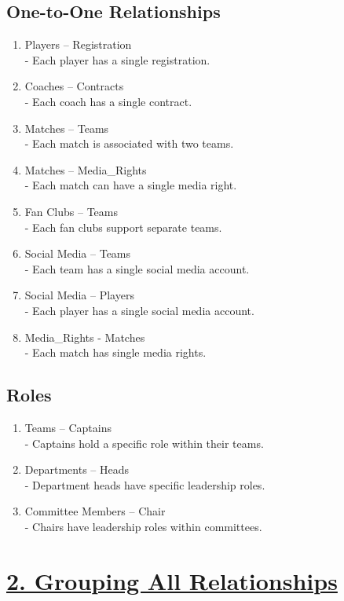 \documentclass[a4paper, 12pt]{article}
\begin{document}
\subsection{One-to-One Relationships}

\begin{enumerate}
\item Players – Registration \\
- Each player has a single registration.
\item Coaches – Contracts \\
- Each coach has a single contract.
\item Matches – Teams \\
- Each match is associated with two teams.
\item Matches – Media\_Rights \\
- Each match can have a single media right.
\item Fan Clubs – Teams \\
- Each fan clubs support separate teams.
\item Social Media – Teams \\
- Each team has a single social media account.
\item Social Media – Players \\
- Each player has a single social media account.
\item Media\_Rights - Matches\\
- Each match has single media rights.
\end{enumerate}

\subsection{Roles}

\begin{enumerate}
\item Teams – Captains \\
- Captains hold a specific role within their teams.
\item Departments – Heads \\
- Department heads have specific leadership roles.
\item Committee Members – Chair \\
- Chairs have leadership roles within committees.
\end{enumerate}

\newpage
\section{\underline{2. Grouping All Relationships}}
\end{document}
